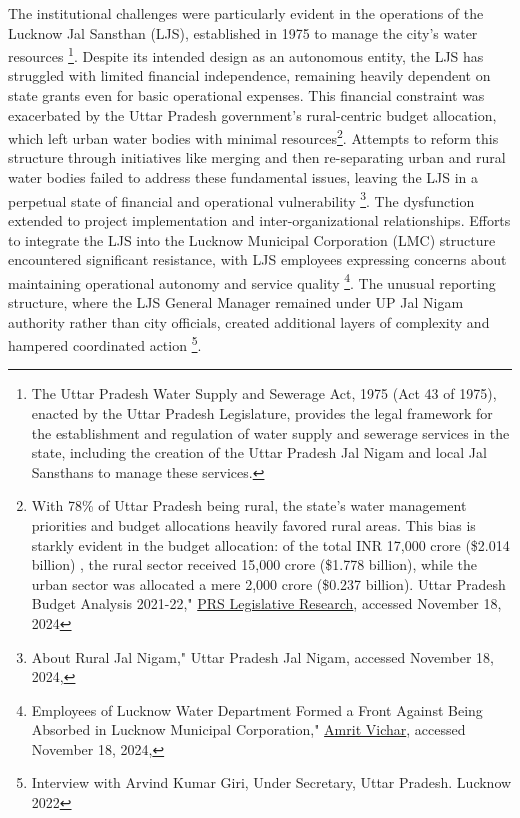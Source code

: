 The institutional challenges were particularly evident in the operations of the Lucknow Jal Sansthan (LJS), established in 1975 to manage the city's water resources \footnote{The Uttar Pradesh Water Supply and Sewerage Act, 1975 (Act 43 of 1975), enacted by the Uttar Pradesh Legislature, provides the legal framework for the establishment and regulation of water supply and sewerage services in the state, including the creation of the Uttar Pradesh Jal Nigam and local Jal Sansthans to manage these services.
}. Despite its intended design as an autonomous entity, the LJS has struggled with limited financial independence, remaining heavily dependent on state grants even for basic operational expenses. This financial constraint was exacerbated by the Uttar Pradesh government's rural-centric budget allocation, which left urban water bodies with minimal resources\footnote{With 78\% of Uttar Pradesh being rural, the state's water management priorities and budget allocations heavily favored rural areas. This bias is starkly evident in the budget allocation: of the total INR 17,000 crore (\$2.014 billion) , the rural sector received 15,000 crore (\$1.778 billion), while the urban sector was allocated a mere 2,000 crore (\$0.237 billion). Uttar Pradesh Budget Analysis 2021-22," \href{https://prsindia.org/budgets/states/uttar-pradesh-budget-analysis-2021-22}{PRS Legislative Research}, accessed November 18, 2024}. Attempts to reform this structure through initiatives like merging and then re-separating urban and rural water bodies failed to address these fundamental issues, leaving the LJS in a perpetual state of financial and operational vulnerability \footnote{About Rural Jal Nigam," Uttar Pradesh Jal Nigam, accessed November 18, 2024,}. The dysfunction extended to project implementation and inter-organizational relationships. Efforts to integrate the LJS into the Lucknow Municipal Corporation (LMC) structure encountered significant resistance, with LJS employees expressing concerns about maintaining operational autonomy and service quality \footnote{Employees of Lucknow Water Department Formed a Front Against Being Absorbed in Lucknow Municipal Corporation," \href{ https://www.amritvichar.com/article/405452/employees-of-lucknow-water-department-formed-a-front-and-wrote#gsc.tab=0}{Amrit Vichar}, accessed November 18, 2024,}. The unusual reporting structure, where the LJS General Manager remained under UP Jal Nigam authority rather than city officials, created additional layers of complexity and hampered coordinated action \footnote{ Interview with Arvind Kumar Giri, Under Secretary, Uttar Pradesh. Lucknow 2022}.

